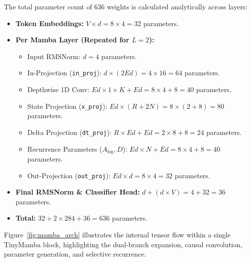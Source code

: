 \documentclass[11pt,a4paper,oneside]{report}
\begin{document}
The total parameter count of 636 weights is calculated analytically across layers:
\begin{itemize}
    \item \textbf{Token Embeddings:} $V \times d = 8 \times 4 = 32$ parameters.
    \item \textbf{Per Mamba Layer (Repeated for $L=2$):}
    \begin{itemize}
        \item Input RMSNorm: $d = 4$ parameters.
        \item In-Projection (\texttt{in\_proj}): $d \times (2Ed) = 4 \times 16 = 64$ parameters.
        \item Depthwise 1D Conv: $Ed \times 1 \times K + Ed = 8 \times 4 + 8 = 40$ parameters.
        \item State Projection (\texttt{x\_proj}): $Ed \times (R + 2N) = 8 \times (2 + 8) = 80$ parameters.
        \item Delta Projection (\texttt{dt\_proj}): $R \times Ed + Ed = 2 \times 8 + 8 = 24$ parameters.
        \item Recurrence Parameters ($A_{\text{log}}, D$): $Ed \times N + Ed = 8 \times 4 + 8 = 40$ parameters.
        \item Out-Projection (\texttt{out\_proj}): $Ed \times d = 8 \times 4 = 32$ parameters.
    \end{itemize}
    \item \textbf{Final RMSNorm \& Classifier Head:} $d + (d \times V) = 4 + 32 = 36$ parameters.
    \item \textbf{Total:} $32 + 2 \times 284 + 36 = 636$ parameters.
\end{itemize}

Figure~\ref{fig:mamba_arch} illustrates the internal tensor flow within a single TinyMamba block, highlighting the dual-branch expansion, causal convolution, parameter generation, and selective recurrence.
\end{document}
